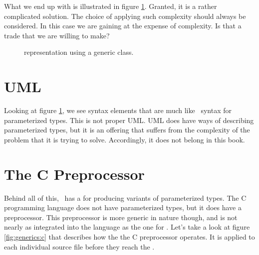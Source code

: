 What we end up with is illustrated in figure \ref{fig:generics:linesegment:generics}. Granted, it is a rather complicated solution. The choice of applying such complexity should always be considered. In this case we are gaining  at the expense of complexity. Is that a trade that we are willing to make?

\begin{figure}[tbp]
  
  \caption{ representation using a generic class.}
  \label{fig:generics:linesegment:generics}
\end{figure}

\section{UML}

Looking at figure \ref{fig:generics:linesegment:generics}, we see syntax elements that are much like \csharp\ syntax for parameterized types. This is not proper UML. UML does have ways of describing parameterized types, but it is an offering that suffers from the complexity of the problem that it is trying to solve. Accordingly, it does not belong in this book.

\section{The C Preprocessor}

Behind all of this, \csharp\ has a  for producing variants of parameterized types. The C programming language does not have parameterized types, but it does have a preprocessor. This preprocessor is more generic in nature though, and is not nearly as integrated into the language as the one for \csharp. Let's take a look at figure \ref{fig:generics:c} that describes how the the C preprocessor operates. It is applied to each individual source file before they reach the .

